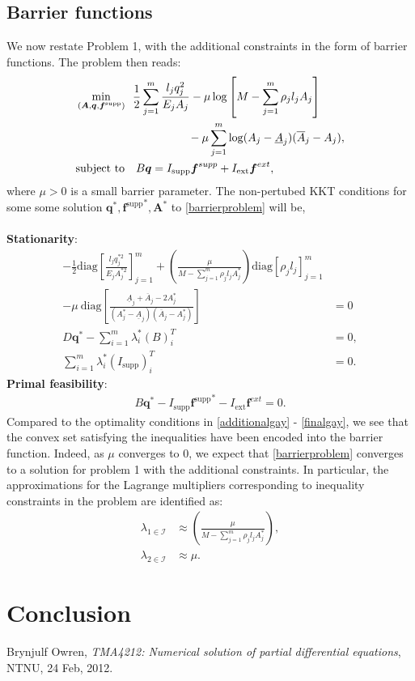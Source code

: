 \documentclass[10pt,a4paper]{article}
\begin{document}
\subsection{Barrier functions}
We now restate Problem 1, with the additional constraints in the form of barrier functions. The problem then reads:
\begin{align}\label{barrierproblem}
&\min_{(\boldsymbol{A},\boldsymbol{q},\boldsymbol{f}^\text{supp})} \enspace \frac{1}{2}\sum_{j=1}^m
\frac{l_j q_j^2}{E_j A_j} - \mu \log \left[ M - \sum_{j=1}^m \rho_j l_j A_j \right] \\
\nonumber & \hspace{35 mm} - \mu \sum_{j=1}^m \log (A_j-\underline{A}_j)(\overline{A}_j-A_j),\\
&\text{subject to} \quad B\boldsymbol{q} = I_\text{supp}\boldsymbol{f}^{supp}+I_\text{ext}\boldsymbol{f}^{ext}\nonumber,
\end{align}
where $\mu > 0 $ is a small barrier parameter.
\newpage
\noindent
The non-pertubed KKT conditions for some some solution $\boldsymbol{q}^*,{\boldsymbol{f}^\text{supp}}^*,\boldsymbol{A}^*$ to \eqref{barrierproblem} will be,
\\\\
\textbf{Stationarity}:
\begin{align}
-\frac{1}{2}\text{diag}\left[ \frac{l_j q_j^{*2}}{E_j A_j^{*2}}\right]_{j=1}^m + \left(\frac{\mu}{M-\sum_{j=1}^m \rho_j l_j A_j^*}\right) \text{diag}\left[ \rho_j l_j \right]_{j=1}^m \\
-\mu \ \text{diag}\left[\frac{\underline{A}_j+\overline{A}_j-2A_j^*}{(A_j^*-\underline{A}_j)(\overline{A}_j-A_j^*)}\right]&=0 \nonumber\\
D\boldsymbol{q}^* - \sum_{i=1}^m \lambda_i^*(B)_i^T &= 0,\\
\sum_{i=1}^m \lambda_i^*(I_\text{supp})_i^T &= 0.
\end{align}
\textbf{Primal feasibility}:
\begin{align}
B\boldsymbol{q}^*-I_\text{supp}{\boldsymbol{f}^\text{supp}}^*-I_\text{ext}\boldsymbol{f}^{ext}=0.
\end{align}
Compared to the optimality conditions in \eqref{additionalgay} - \eqref{finalgay}, we see that the convex set satisfying the inequalities have been encoded into the barrier function. Indeed, as $\mu$ converges to $0$, we expect that \eqref{barrierproblem} converges to a solution for problem 1 with the additional constraints. In particular, the approximations for the Lagrange multipliers corresponding to inequality constraints in the problem are identified as:
\begin{align}
\lambda_{1\in\mathcal{I}} &\approx \left(\frac{\mu}{M-\sum_{j=1}^m \rho_j l_j A_j^*}\right),\\
\lambda_{2\in\mathcal{I}} &\approx \mu.
\end{align}
\section{Conclusion}
\begin{thebibliography}{2}
Brynjulf Owren, \emph{TMA4212: Numerical solution of partial differential equations}, NTNU, 24 Feb, 2012.
\end{thebibliography}
\end{document}
